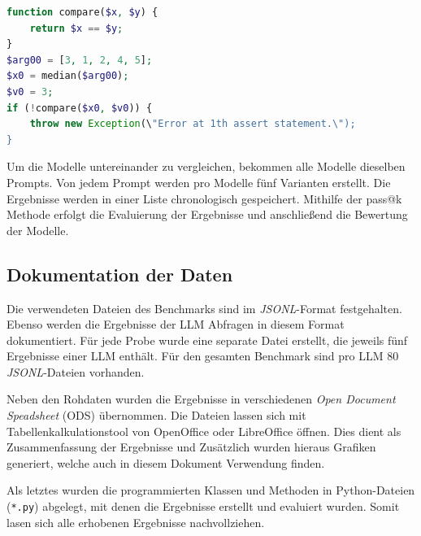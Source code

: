 \begin{lstlisting}[language=php,caption={Beispiel für einen Test aus dem HumanEval-XL Benchmark},label=lst:example_prompt_test_by_humaneval_benchmark]
function compare($x, $y) {
	return $x == $y;
}
$arg00 = [3, 1, 2, 4, 5];
$x0 = median($arg00);
$v0 = 3;
if (!compare($x0, $v0)) {
	throw new Exception(\"Error at 1th assert statement.\");
}
\end{lstlisting}

Um die Modelle untereinander zu vergleichen, bekommen alle Modelle dieselben Prompts. Von jedem Prompt werden pro Modelle fünf Varianten erstellt. Die Ergebnisse werden in einer Liste chronologisch gespeichert. Mithilfe der pass@k Methode erfolgt die Evaluierung der Ergebnisse und anschließend die Bewertung der Modelle.


\subsection{Dokumentation der Daten}
Die verwendeten Dateien des Benchmarks sind im \textit{JSONL}-Format festgehalten. Ebenso werden die Ergebnisse der LLM Abfragen in diesem Format dokumentiert. Für jede Probe wurde eine separate Datei erstellt, die jeweils fünf Ergebnisse einer LLM enthält. Für den gesamten Benchmark sind pro LLM 80 \textit{JSONL}-Dateien vorhanden.\vspace{0.2cm}

Neben den Rohdaten wurden die Ergebnisse in verschiedenen \textit{Open Document Speadsheet} (ODS) übernommen. Die Dateien lassen sich mit Tabellenkalkulationstool von OpenOffice oder LibreOffice öffnen. Dies dient als Zusammenfassung der Ergebnisse und Zusätzlich wurden hieraus Grafiken generiert, welche auch in diesem Dokument Verwendung finden.\vspace{0.2cm}

Als letztes wurden die programmierten Klassen und Methoden in Python-Dateien (\texttt{*.py}) abgelegt, mit denen die Ergebnisse erstellt und evaluiert wurden. Somit lasen sich alle erhobenen Ergebnisse nachvollziehen.



